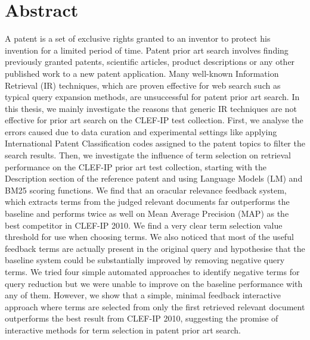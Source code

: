 \chapter*{Abstract}
\vspace{-1em}
A patent is a set of exclusive rights granted to an inventor to protect 
his invention for a limited period of time. Patent prior art search involves 
finding previously granted patents, 
scientific articles, product descriptions or any other published work 
to a new patent application.
Many well-known Information Retrieval (IR) techniques, which are proven effective 
for web search such as typical query expansion methods, are unsuccessful for patent 
prior art search.
In this thesis, we mainly investigate the reasons that generic IR techniques are not 
effective for prior art search on the CLEF-IP test collection.   
First, we analyse the errors caused due to data curation and experimental settings 
like applying International Patent Classification codes assigned to the patent topics 
to filter the search results.  
Then, we investigate the influence of term selection on retrieval
performance on the CLEF-IP prior art test collection, starting with
the Description section of the reference patent and using Language Models (LM) and BM25
scoring functions. We find that an oracular relevance feedback system,
which extracts terms from the judged relevant documents far
outperforms the baseline and performs twice as well on Mean Average Precision (MAP) as the best
competitor in CLEF-IP 2010. We find a very clear term selection value
threshold for use when choosing terms.  We also noticed that most of
the useful feedback terms are actually present in the original query
and hypothesise that the baseline system could be substantially
improved by removing negative query terms.
We tried four simple automated approaches to identify negative terms
for query reduction but we were unable to improve on the baseline
performance with any of them. However, we show that a
simple, minimal feedback interactive approach where terms are selected
from only the first retrieved relevant document outperforms the best
result from CLEF-IP 2010, suggesting the promise of interactive methods
for term selection in patent prior art search.

